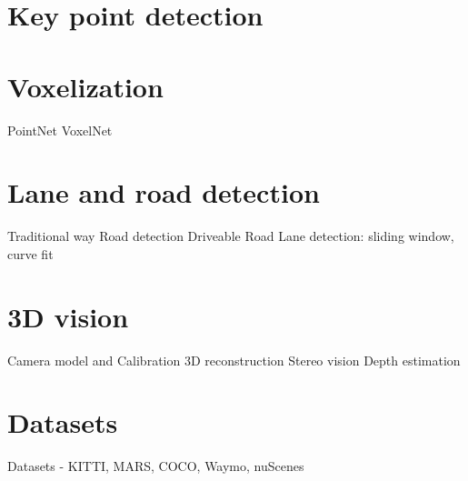 \section{Key point detection}

\section{Voxelization}
PointNet
VoxelNet
\section{Lane and road detection}
Traditional way
Road detection
Driveable Road
Lane detection: sliding window, curve fit
\section{3D vision}
Camera model and Calibration
3D reconstruction
Stereo vision
Depth estimation
\section{Datasets}
Datasets - KITTI, MARS, COCO, Waymo, nuScenes










